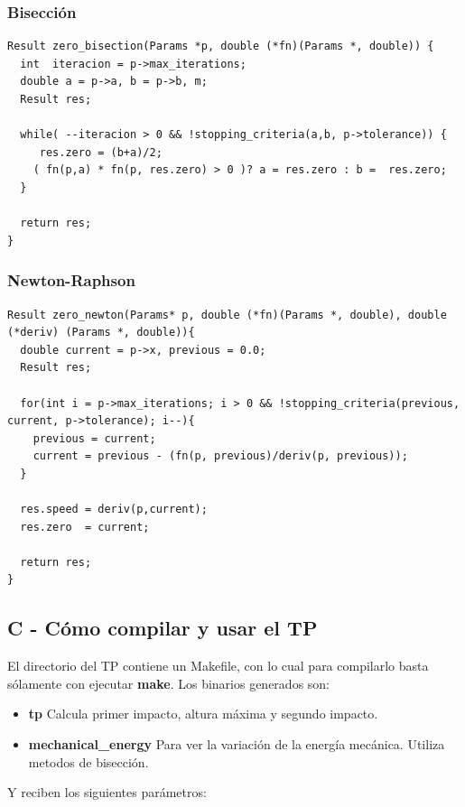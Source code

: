 \documentclass[a4paper]{article}
\begin{document}
\subsubsection{Bisección}
\begin{verbatim}
Result zero_bisection(Params *p, double (*fn)(Params *, double)) {
  int  iteracion = p->max_iterations;
  double a = p->a, b = p->b, m;
  Result res;

  while( --iteracion > 0 && !stopping_criteria(a,b, p->tolerance)) {
     res.zero = (b+a)/2;
    ( fn(p,a) * fn(p, res.zero) > 0 )? a = res.zero : b =  res.zero;
  }

  return res;
}
\end{verbatim}


\subsubsection{Newton-Raphson}
\begin{verbatim}
Result zero_newton(Params* p, double (*fn)(Params *, double), double (*deriv) (Params *, double)){
  double current = p->x, previous = 0.0;
  Result res;

  for(int i = p->max_iterations; i > 0 && !stopping_criteria(previous, current, p->tolerance); i--){
    previous = current;
    current = previous - (fn(p, previous)/deriv(p, previous));
  }

  res.speed = deriv(p,current);
  res.zero  = current;

  return res;
}
\end{verbatim}

\subsection{C - Cómo compilar y usar el TP}
El directorio del TP contiene un Makefile, con lo cual para compilarlo basta sólamente con ejecutar \textbf{make}. Los binarios generados son: 

\begin{itemize}
  \item \textbf{tp} Calcula primer impacto, altura máxima y segundo impacto.
  \item \textbf{mechanical\_energy} Para ver la variación de la energía mecánica. Utiliza metodos de bisección.
\end{itemize}

Y reciben los siguientes parámetros:
\end{document}
